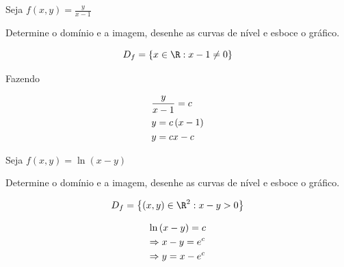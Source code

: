 \documentclass[11pt, oneside, a4paper]{gsm-l}
\begin{document}
\begin{exem}
Seja $\displaystyle f\left( {x,y} \right) = \frac{y}{x - 1}$

Determine o domínio e a imagem, desenhe as curvas de nível e esboce o gráfico.
\end{exem}

\newpage 

\begin{sol}
\[
D_f  = \left\{ {x \in \R:x - 1 \ne 0} \right\}
\]

Fazendo

\[
\begin{gathered}
\frac{y}
{{x - 1}} = c \hfill \\
y = c\left( {x - 1} \right) \hfill \\
y = cx - c \hfill \\
\end{gathered}
\]



\end{sol}

\begin{exem}
Seja $f\left( {x,y} \right) = \ln \left( {x - y} \right)$

Determine o domínio e a imagem, desenhe as curvas de nível e esboce o gráfico.
\end{exem}

\begin{sol}
\[
D_f  = \left\{ {\left( {x,y} \right) \in \R^2 :x - y > 0} \right\}
\]


\[
\begin{gathered}
\ln \left( {x - y} \right) = c \hfill \\
\Rightarrow x - y = e^c  \hfill \\
\Rightarrow y = x - e^c  \hfill \\
\end{gathered}
\]



\end{sol}
\end{document}
